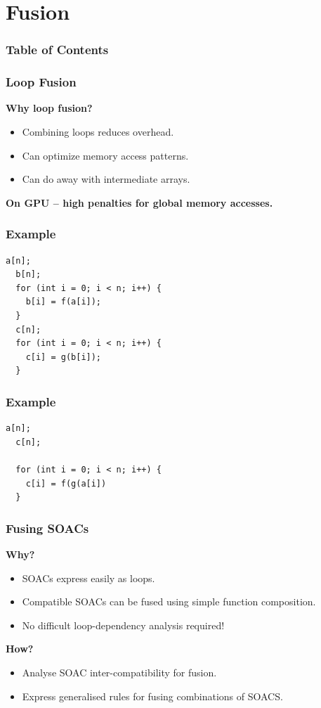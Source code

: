 \documentclass{beamer}
\begin{document}
\section[fus]{Fusion}

\begin{frame}
\frametitle{Table of Contents}
\tableofcontents[currentsection]
\end{frame}

\begin{frame}
  \frametitle{Loop Fusion}
\large \textbf{Why loop fusion?}
\begin{itemize}
\item Combining loops reduces overhead.
\item Can optimize memory access patterns.
\item Can do away with intermediate arrays.
\end{itemize}
\large \textbf{On GPU -- high penalties for global memory accesses.}
\end{frame}

\begin{frame}[fragile]
  \frametitle{Example}
\begin{lstlisting}[caption=Producer-Consumer pre-fusion.,label={lst:pc-pre}] 
  a[n];
  b[n];
  for (int i = 0; i < n; i++) {
    b[i] = f(a[i]);
  }
  c[n];
  for (int i = 0; i < n; i++) {
    c[i] = g(b[i]);
  }
\end{lstlisting}
\end{frame}

\begin{frame}[fragile]
  \frametitle{Example}
\begin{lstlisting}[caption=Producer-Consumer post-fusion.,label={lst:pc-post}] 
  a[n];
  c[n];

  for (int i = 0; i < n; i++) {
    c[i] = f(g(a[i])
  }
\end{lstlisting}
\end{frame}


\begin{frame}
  \frametitle{Fusing SOACs}

\large \textbf{Why?}
  \begin{itemize}
  \item SOACs express easily as loops.
  \item Compatible SOACs can be fused using simple function composition.
  \item No difficult loop-dependency analysis required!
  \end{itemize}

\large \textbf{How?}
\begin{itemize}
\item Analyse SOAC inter-compatibility for fusion.
\item Express generalised rules for fusing combinations of SOACS.
\end{itemize}
\end{frame}
\end{document}
